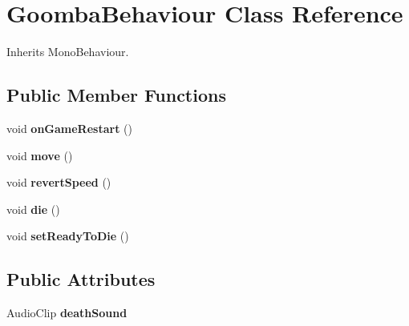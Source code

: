 \hypertarget{class_goomba_behaviour}{\section{Goomba\-Behaviour Class Reference}
\label{class_goomba_behaviour}
}


Inherits Mono\-Behaviour.

\subsection*{Public Member Functions}
\begin{DoxyCompactItemize}
\item 
\hypertarget{class_goomba_behaviour_a8b8fb9bf4a62bd4311fd8862b94dc620}{void {\bfseries on\-Game\-Restart} ()}\label{class_goomba_behaviour_a8b8fb9bf4a62bd4311fd8862b94dc620}

\item 
\hypertarget{class_goomba_behaviour_afb1749e26a69ee406a5a90b4cc7aa612}{void {\bfseries move} ()}\label{class_goomba_behaviour_afb1749e26a69ee406a5a90b4cc7aa612}

\item 
\hypertarget{class_goomba_behaviour_ac919845ef3d3061ea65fc6947b872268}{void {\bfseries revert\-Speed} ()}\label{class_goomba_behaviour_ac919845ef3d3061ea65fc6947b872268}

\item 
\hypertarget{class_goomba_behaviour_ab8899c8651503b497d3bb66a82e2fdc1}{void {\bfseries die} ()}\label{class_goomba_behaviour_ab8899c8651503b497d3bb66a82e2fdc1}

\item 
\hypertarget{class_goomba_behaviour_a94d6391aa32488ce6e2d9ddd736793b1}{void {\bfseries set\-Ready\-To\-Die} ()}\label{class_goomba_behaviour_a94d6391aa32488ce6e2d9ddd736793b1}

\end{DoxyCompactItemize}
\subsection*{Public Attributes}
\begin{DoxyCompactItemize}
\item 
\hypertarget{class_goomba_behaviour_a1cd12ebf607a78bf17bace7ceb9fae41}{Audio\-Clip {\bfseries death\-Sound}}\label{class_goomba_behaviour_a1cd12ebf607a78bf17bace7ceb9fae41}

\end{DoxyCompactItemize}
